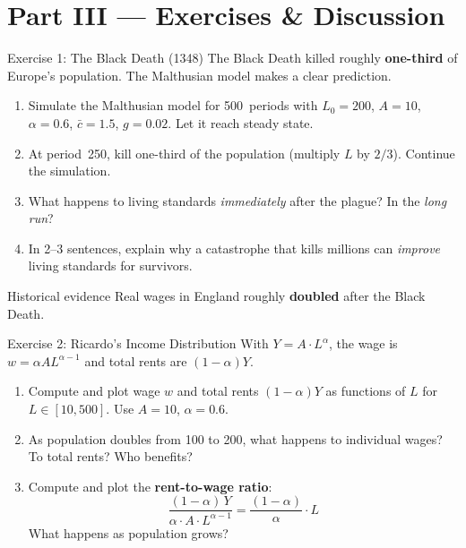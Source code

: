 \documentclass[aspectratio=169, 10pt]{beamer}
\begin{document}
\section{Part III --- Exercises \& Discussion}

\begin{frame}{Exercise 1: The Black Death (1348)}
The Black Death killed roughly \textbf{one-third} of Europe's population.
The Malthusian model makes a clear prediction.
\vspace{0.5em}
\begin{enumerate}
  \item Simulate the Malthusian model for 500~periods with
        $L_0 = 200$, $A = 10$, $\alpha = 0.6$, $\bar{c} = 1.5$,
        $g = 0.02$. Let it reach steady state.
  \item At period~250, kill one-third of the population
        (multiply $L$ by $2/3$). Continue the simulation.
  \item What happens to living standards \textit{immediately}
        after the plague? In the \textit{long run}?
  \item In 2--3 sentences, explain why a catastrophe that kills
        millions can \textit{improve} living standards for survivors.
\end{enumerate}
\vspace{0.3em}
\begin{block}{Historical evidence}
  Real wages in England roughly \textbf{doubled} after the Black Death.
\end{block}
\end{frame}

\begin{frame}{Exercise 2: Ricardo's Income Distribution}
With $Y = A \cdot L^\alpha$, the wage is $w = \alpha A L^{\alpha-1}$
and total rents are $(1-\alpha)Y$.
\vspace{0.5em}
\begin{enumerate}
  \item Compute and plot wage $w$ and total rents $(1-\alpha)Y$
        as functions of $L$ for $L \in [10, 500]$.
        Use $A = 10$, $\alpha = 0.6$.
  \item As population doubles from 100 to 200, what happens to
        individual wages? To total rents? Who benefits?
  \item Compute and plot the \textbf{rent-to-wage ratio}:
        \[
          \frac{(1-\alpha)\,Y}{\alpha \cdot A \cdot L^{\alpha-1}}
          = \frac{(1-\alpha)}{\alpha} \cdot L
        \]
        What happens as population grows?
\end{enumerate}
\end{frame}
\end{document}
